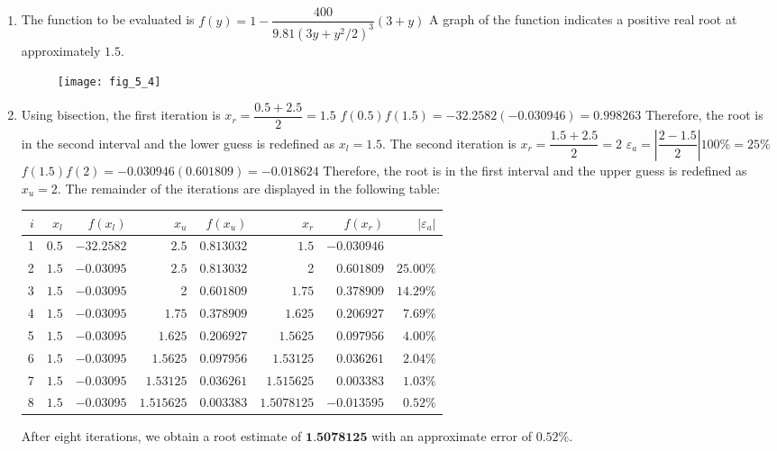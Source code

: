 \documentclass[../main.tex]{subfiles}
\begin{document}
\section{}
\begin{enumerate}[label=\bfseries(\alph*)]
\item The function to be evaluated is
\bigbreak
$f(y)=1-\dfrac{400}{9.81\left(3 y+y^{2} / 2\right)^{3}}(3+y)$
\bigbreak
A graph of the function indicates a positive real root at approximately $1.5 .$
\bigbreak
\begin{figure}[H]
		\hspace*{0.7cm}\texttt{[image: fig\_5\_4]}
		\label{fig:fig_5_4}
	\end{figure}
\bigbreak
\item Using bisection, the first iteration is
\bigbreak
$x_{r}=\dfrac{0.5+2.5}{2}=1.5$
\bigbreak
$f(0.5) f(1.5)=-32.2582(-0.030946)=0.998263$
\bigbreak
Therefore, the root is in the second interval and the lower guess is redefined as $x_{l}=1.5$. The second iteration is
\bigbreak
$x_{r}=\dfrac{1.5+2.5}{2}=2$
\bigbreak
$\varepsilon_{a}=\left|\dfrac{2-1.5}{2}\right| 100 \%=25 \%$
\bigbreak
$f(1.5) f(2)=-0.030946(0.601809)=-0.018624$
\bigbreak
Therefore, the root is in the first interval and the upper guess is redefined as $x_{u}=2$. The remainder of the iterations are displayed in the following table:
\bigbreak

\begin{tabular}{|r|r|r|r|r|r|r|r|}
\hline
$i$ & $x_{l}$ & $f\left(x_{l}\right)$ & $x_{u}$ & $f\left(x_{u}\right)$ & $x_{r}$ & $f\left(x_{r}\right)$ & $\left|\varepsilon_{a}\right|$ \\
\hline
1 & $0.5$ & $-32.2582$ & $2.5$ & $0.813032$ & $1.5$ & $-0.030946$ &  \\
\hline
2 & $1.5$ & $-0.03095$ & $2.5$ & $0.813032$ & 2 & $0.601809$ & $25.00 \%$ \\
\hline
3 & $1.5$ & $-0.03095$ & 2 & $0.601809$ & $1.75$ & $0.378909$ & $14.29 \%$ \\
\hline
4 & $1.5$ & $-0.03095$ & $1.75$ & $0.378909$ & $1.625$ & $0.206927$ & $7.69 \%$ \\
\hline
5 & $1.5$ & $-0.03095$ & $1.625$ & $0.206927$ & $1.5625$ & $0.097956$ & $4.00 \%$ \\
\hline
6 & $1.5$ & $-0.03095$ & $1.5625$ & $0.097956$ & $1.53125$ & $0.036261$ & $2.04 \%$ \\
\hline
7 & $1.5$ & $-0.03095$ & $1.53125$ & $0.036261$ & $1.515625$ & $0.003383$ & $1.03 \%$ \\
\hline
8 & $1.5$ & $-0.03095$ & $1.515625$ & $0.003383$ & $1.5078125$ & $-0.013595$ & $0.52 \%$ \\
\hline
\end{tabular}
\bigbreak
After eight iterations, we obtain a root estimate of $\mathbf{1 . 5 0 7 8 1 2 5}$ with an approximate error of $0.52 \% .$
\bigbreak


\end{enumerate}
\end{document}
